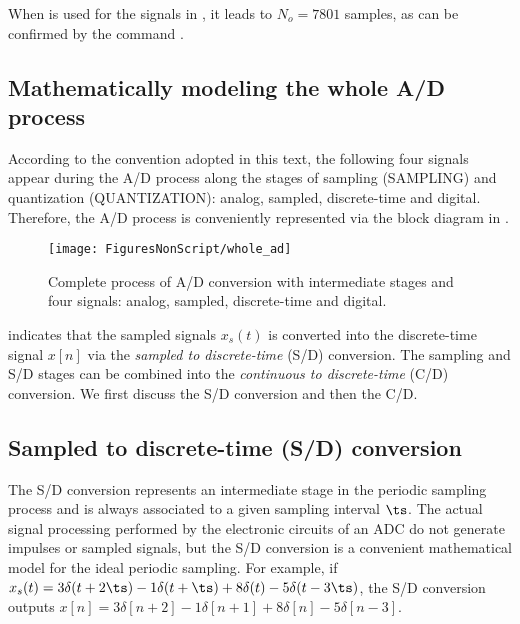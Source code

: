 When  is used for the signals in , it leads to $N_o=7801$ samples, as can be confirmed by the command .

\subsection{Mathematically modeling the whole A/D process}

According to the convention adopted in this text, the following four signals appear during the A/D process along the stages of sampling (SAMPLING) and quantization (QUANTIZATION):
analog, sampled, discrete-time and digital.
Therefore, the A/D process is conveniently represented via the block diagram in .

\begin{figure}
	\centering
		\texttt{[image: FiguresNonScript/whole\_ad]}
	\caption{Complete process of A/D conversion with intermediate stages and four signals: analog, sampled, discrete-time and digital.\label{fig:whole_ad}}
\end{figure}

 indicates that the sampled signals $x_s(t)$ is converted into the discrete-time signal $x[n]$ via the \emph{sampled to discrete-time} (S/D) conversion.
The sampling and S/D stages can be combined into the \emph{continuous to discrete-time} (C/D) conversion. We first discuss the S/D conversion and then the C/D.

\subsection{Sampled to discrete-time (S/D) conversion}
\label{sec:sd_conversion}


The S/D conversion represents an intermediate stage in the periodic sampling process and is always associated to a given sampling interval $\ts$. The actual signal processing performed by the electronic circuits of an ADC do not generate impulses or sampled signals, but the S/D conversion is a convenient mathematical model for the ideal periodic sampling.
For example, if $x_s(t) = 3\delta(t+ 2 \ts) - 1 \delta(t +  \ts) + 8\delta(t) - 5\delta(t-3\ts)$, the S/D conversion outputs $x[n] = 3\delta[n+ 2] - 1 \delta[n + 1] + 8\delta[n] - 5\delta[n-3]$. 


